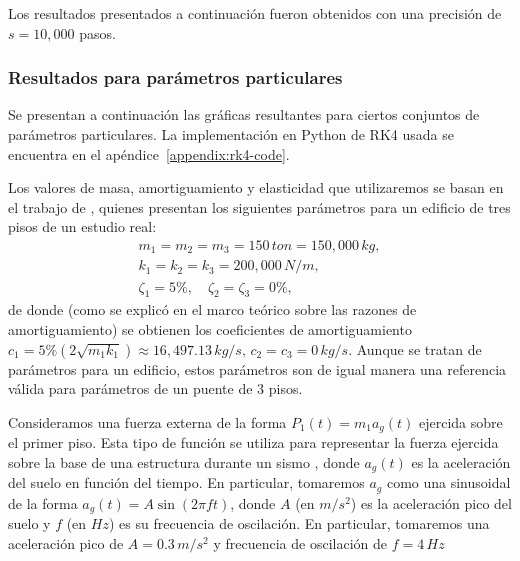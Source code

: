 Los resultados presentados a continuación fueron obtenidos con una precisión de \(s = 10,000\) pasos.

\subsubsection*{Resultados para parámetros particulares}

Se presentan a continuación las gráficas resultantes para ciertos conjuntos de parámetros particulares. La implementación en Python de RK4 usada se encuentra en el apéndice~\ref{appendix:rk4-code}.

Los valores de masa, amortiguamiento y elasticidad que utilizaremos se basan en el trabajo de \citet{tarque}, quienes presentan los siguientes parámetros para un edificio de tres pisos de un estudio real:
\begin{gather}\label{eqn:sol-sismo-params}
    m_1 = m_2 = m_3 = 150 \, \si{ton} = 150,000 \, \si{kg}, \\
    k_1 = k_2 = k_3 = 200,000 \, \si{N/m}, \\
    \zeta_1 = 5\%, \quad \zeta_2 = \zeta_3 = 0\%
,\end{gather}
de donde (como se explicó en el marco teórico sobre las razones de amortiguamiento) se obtienen los coeficientes de amortiguamiento \(c_1 = 5\%(2\sqrt{m_1 k_1}) \approx 16,497.13 \, \si{kg/s}, \,
c_2 = c_3 = 0 \, \si{kg/s}\). Aunque se tratan de parámetros para un edificio, estos parámetros son de igual manera una referencia válida para parámetros de un puente de 3 pisos.


%

Consideramos una fuerza externa de la forma \(P_1(t) = m_1 a_g(t)\) ejercida sobre el primer piso. Esta tipo de función se utiliza para representar la fuerza ejercida sobre la base de una estructura durante un sismo \citep{kramer}, donde \(a_g(t)\) es la aceleración del suelo en función del tiempo. En particular, tomaremos \(a_g\) como una sinusoidal de la forma \(a_g(t) = A\sin(2\pi f t)\), donde \(A\) (en \(\si{m/s^2}\)) es la aceleración pico del suelo y \(f\) (en \(\si{Hz}\)) es su frecuencia de oscilación. En particular, tomaremos una aceleración pico de \(A = 0.3 \, \si{m/s^2}\) y frecuencia de oscilación de \(f = 4 \, \si{Hz}\)

